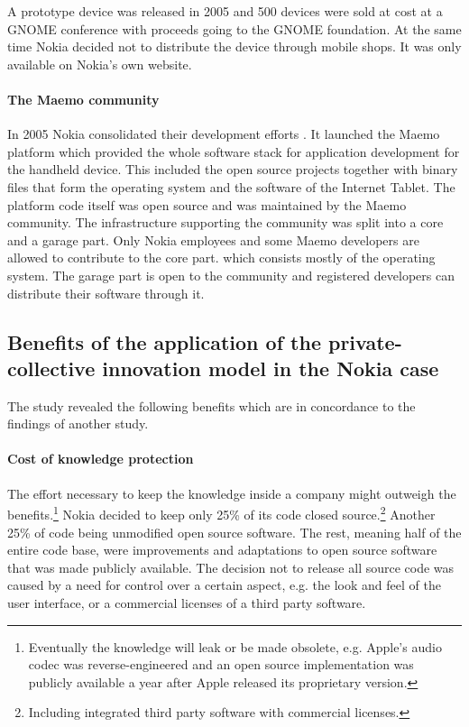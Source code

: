 \documentclass[a4paper]{scrartcl}
\begin{document}
A prototype device was released in 2005 and 500 devices were sold at cost at a GNOME conference with proceeds going to the GNOME foundation.
At the same time Nokia decided not to distribute the device through mobile shops.
It was only available on Nokia's own website.

\paragraph{The Maemo community}
In 2005 Nokia consolidated their development efforts .
It launched the Maemo platform which provided the whole software stack for application development for the handheld device.
This included the open source projects together with binary files that form the operating system and the software of the Internet Tablet.
The platform code itself was open source and was maintained by the Maemo community.
The infrastructure supporting the community was split into a core and a garage part.
Only Nokia employees and some Maemo developers are allowed to contribute to the core part. which consists mostly of the operating system.
The garage part is open to the community and registered developers can distribute their software through it.


\subsection{Benefits of the application of the private-collective innovation model in the Nokia case}

The study revealed the following benefits which are in concordance to the findings of another study\cite{von2009open}.

\paragraph{Cost of knowledge protection}
The effort necessary to keep the knowledge inside a company might outweigh the benefits.\footnote{Eventually the knowledge will leak or be made obsolete, e.g. Apple's audio codec was reverse-engineered and an open source implementation was publicly available a year after Apple released its proprietary version.}
Nokia decided to keep only 25\% of its code closed source.\footnote{Including integrated third party software with commercial licenses.} 
Another 25\% of code being unmodified open source software. 
The rest, meaning half of the entire code base, were improvements and adaptations to open source software that was made publicly available.
The decision not to release all source code was caused by a need for control over a certain aspect, e.g. the look and feel of the user interface, or a commercial licenses of a third party software.
\end{document}
